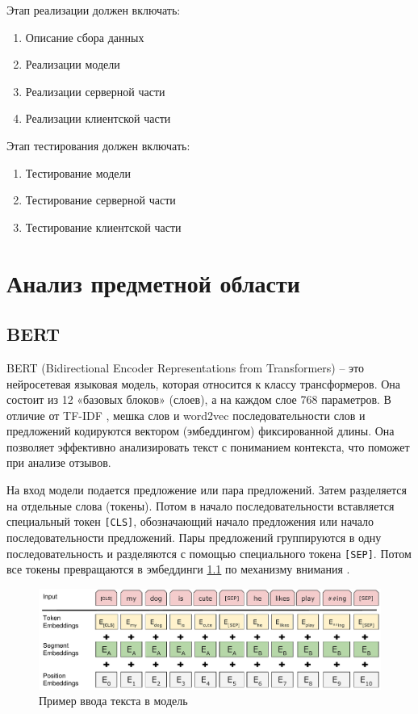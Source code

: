 \documentclass[PI, VKR]{HSEUniversity}
\begin{document}
Этап реализации должен включать:
\begin{enumerate}
\item Описание сбора данных
\item Реализации модели
\item Реализации серверной части
\item Реализации клиентской части
\end{enumerate}

Этап тестирования должен включать:
\begin{enumerate}
\item Тестирование модели
\item Тестирование серверной части
\item Тестирование клиентской части
\end{enumerate}
\chapter{Анализ предметной области}
\label{sec:org6683474}
\section{BERT}
\label{sec:orgd95ca15}
BERT \autocite{devlin2018bert} (Bidirectional Encoder Representations from Transformers) -- это нейросетевая языковая модель, которая относится к классу трансформеров. Она состоит из 12 «базовых блоков» (слоев), а на каждом слое 768 параметров. В отличие от TF-IDF \autocite{jones1972statistical}, мешка слов\autocite{doi:10.1080/00437956.1954.11659520} и word2vec \autocite{mikolov2013efficient} последовательности слов и предложений кодируются вектором (эмбеддингом) фиксированной длины. Она позволяет эффективно анализировать текст с пониманием контекста, что поможет при анализе отзывов.

На вход модели подается предложение или пара предложений. Затем разделяется на отдельные слова (токены).  Потом в начало последовательности вставляется специальный токен \texttt{[CLS]}, обозначающий начало предложения или начало последовательности предложений. Пары предложений группируются в одну последовательность и разделяются с помощью специального токена \texttt{[SEP]}. Потом все токены превращаются в эмбеддинги \ref{fig:inputemebeddings} по механизму внимания \autocite{NIPS2017_3f5ee243}.

\begin{figure}[h]
\centering
\includegraphics[width=.9\linewidth]{img/Input_Emebeddings.pdf}
\caption{\label{fig:inputemebeddings}Пример ввода текста в модель}
\end{figure}
\end{document}
